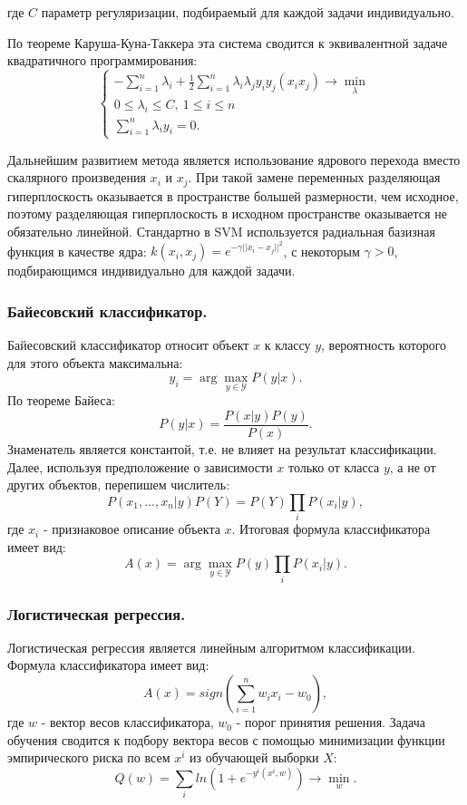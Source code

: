 \documentclass[14pt]{extarticle}
\begin{document}
где $C$ параметр регуляризации, подбираемый для каждой задачи индивидуально.
\par
По теореме Каруша-Куна-Таккера эта система сводится к эквивалентной задаче
квадратичного программирования:
\[\begin{cases}
    -\sum_{i=1}^n \lambda_i + \frac{1}{2}\sum_{i=1}^n \lambda_i\lambda_j
    y_i y_j (x_i x_j) \to \min_\lambda \\
    0 \le \lambda_i \le C,\ 1 \le i \le n \\
    \sum_{i=1}^n \lambda_i y_i=0.
\end{cases}\]
\par
Дальнейшим развитием метода является использование ядрового перехода вместо
скалярного произведения $x_i$ и $x_j$. При такой замене переменных разделяющая 
гиперплоскость оказывается в пространстве большей размерности, чем исходное, поэтому
разделяющая гиперплоскость в исходном пространстве оказывается не обязательно линейной.
Стандартно в SVM используется радиальная базизная функция
в качестве ядра: $k(x_i, x_j)=e^{-\gamma||x_i-x_j||^2}$, с некоторым $\gamma>0$, 
подбирающимся индивидуально для каждой задачи.

\subsubsection{Байесовский классификатор.}

\par
Байесовский классификатор относит объект $x$ к классу $y$, 
вероятность которого для этого объекта максимальна:
\[
    y_i = \arg \max_{y\in\mathcal{Y}} P(y|x).
\]
По теореме Байеса:
\[
    P(y|x)=\frac{P(x|y)P(y)}{P(x)}.
\]
Знаменатель является константой, т.е. не влияет на результат классификации.
Далее, используя предположение о зависимости $x$ только от класса $y$, а не
от других объектов, перепишем числитель:
\[
    P(x_1, ..., x_n|y)P(Y) = P(Y)\prod_i P(x_i|y),
\]
где $x_i$ - признаковое описание объекта $x$. Итоговая формула классификатора имеет вид:
\[
    A(x)=\arg\max_{y\in\mathcal{Y}} P(y)\prod_i P(x_i|y).
\]

\subsubsection{Логистическая регрессия.}

\par
Логистическая регрессия является линейным алгоритмом классификации. Формула классификатора
имеет вид:
\[
    A(x) = sign(\sum_{i=1}^n w_i x_i - w_0),
\]
где $w$ - вектор весов классификатора, $w_0$ - порог принятия решения. Задача обучения
сводится к подбору вектора весов с помощью минимизации функции эмпирического риска
по всем $x^i$ из обучающей выборки $X$:
\[
    Q(w)=\sum_i ln(1+e^{-y^i(x^i, w)}) \to \min_w.
\]
\end{document}
